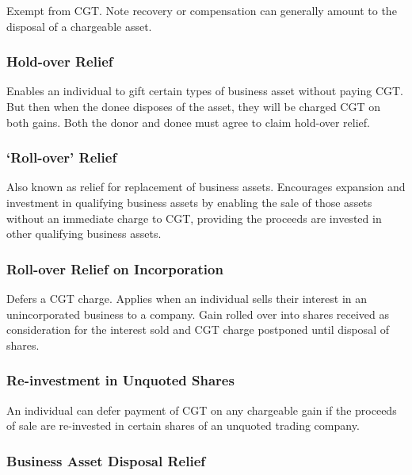 \documentclass[
]{article}
\begin{document}
Exempt from CGT. Note recovery or compensation can generally amount to
the disposal of a chargeable asset.

\hypertarget{hold-over-relief}{%
\subsubsection{Hold-over Relief}\label{hold-over-relief}}

Enables an individual to gift certain types of business asset without
paying CGT. But then when the donee disposes of the asset, they will be
charged CGT on both gains. Both the donor and donee must agree to claim
hold-over relief.

\hypertarget{roll-over-relief}{%
\subsubsection{`Roll-over' Relief}\label{roll-over-relief}}

Also known as relief for replacement of business assets. Encourages
expansion and investment in qualifying business assets by enabling the
sale of those assets without an immediate charge to CGT, providing the
proceeds are invested in other qualifying business assets.

\hypertarget{roll-over-relief-on-incorporation}{%
\subsubsection{Roll-over Relief on
Incorporation}\label{roll-over-relief-on-incorporation}}

Defers a CGT charge. Applies when an individual sells their interest in
an unincorporated business to a company. Gain rolled over into shares
received as consideration for the interest sold and CGT charge postponed
until disposal of shares.

\hypertarget{re-investment-in-unquoted-shares}{%
\subsubsection{Re-investment in Unquoted
Shares}\label{re-investment-in-unquoted-shares}}

An individual can defer payment of CGT on any chargeable gain if the
proceeds of sale are re-invested in certain shares of an unquoted
trading company.

\hypertarget{business-asset-disposal-relief}{%
\subsubsection{Business Asset Disposal
Relief}\label{business-asset-disposal-relief}}
\end{document}
